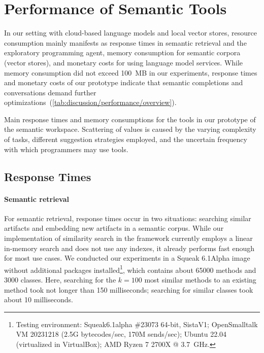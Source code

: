 
\section{Performance of Semantic Tools}
\label{sec:discussion/performance}

In our setting with cloud-based language models and local vector stores, resource consumption mainly manifests as response times in semantic retrieval and the exploratory programming agent, memory consumption for semantic corpora (vector stores), and monetary costs for using language model services.
While memory consumption did not exceed \qty{100}{MB} in our experiments, response times and monetary costs of our prototype indicate that semantic completions and conversations demand further optimizations~(\cref{tab:discussion/performance/overview}).

\begin{table}
	\centering
	\footnotesize
	\caption[Main response times and memory consumptions for the tools in our prototype of the semantic workspace.]{
		Main response times and memory consumptions for the tools in our prototype of the semantic workspace.
		Scattering of values is caused by the varying complexity of tasks, different suggestion strategies employed, and the uncertain frequency with which programmers may use tools.
	}
	\label{tab:discussion/performance/overview}
\end{table}

\subsection*{Response Times}
\label{sec:discussion/performance/latencies}

\paragraph{Semantic retrieval}
\label{par:discussion/performance/latencies/retrieval}

For semantic retrieval, response times occur in two situations: searching similar artifacts and embedding new artifacts in a semantic corpus.
While our implementation of similarity search in the \semtex framework currently employs a linear in-memory search and does not use any indexes, it already performs fast enough for most use cases.
We conducted our experiments in a Squeak 6.1Alpha image without additional packages installed\footnote{Testing environment: Squeak6.1alpha \#23073 64-bit, SistaV1; OpenSmalltalk VM 20231218 (2.5G bytecodes/sec, 170M sends/sec); Ubuntu 22.04 (virtualized in VirtualBox); AMD Ryzen 7 2700X @ \qty{3.7}{GHz}.}, which contains about \num{65000} methods and \num{3000} classes.
Here, searching for the $k = 100$ most similar methods to an existing method took not longer than 150 milliseconds; searching for similar classes took about 10 milliseconds.

